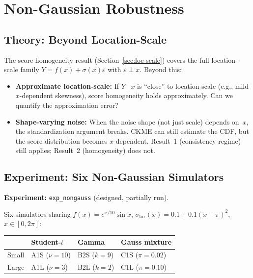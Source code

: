 \documentclass[11pt]{article}
\begin{document}
\section{Non-Gaussian Robustness}
\label{sec:exp-nongauss}

\subsection{Theory: Beyond Location-Scale}

The score homogeneity result (Section~\ref{sec:loc-scale}) covers the
full location-scale family $Y = f(x) + \sigma(x)\varepsilon$ with
$\varepsilon \perp x$. Beyond this:

\begin{itemize}
  \item \textbf{Approximate location-scale:} If $Y \mid x$ is
    ``close'' to location-scale (e.g., mild $x$-dependent skewness),
    score homogeneity holds approximately. Can we quantify the
    approximation error?
  \item \textbf{Shape-varying noise:} When the noise shape (not just
    scale) depends on~$x$, the standardization argument breaks. CKME
    can still estimate the CDF, but the score distribution becomes
    $x$-dependent. Result~1 (consistency regime) still applies;
    Result~2 (homogeneity) does not.
\end{itemize}

\subsection{Experiment: Six Non-Gaussian Simulators}

\textbf{Experiment:} \texttt{exp\_nongauss} (designed, partially run).

Six simulators sharing $f(x) = e^{x/10}\sin x$,
$\sigma_{\mathrm{tar}}(x) = 0.1 + 0.1(x-\pi)^2$, $x \in [0, 2\pi]$:

\begin{center}
\begin{tabular}{@{}llll@{}}
\toprule
& \textbf{Student-$t$} & \textbf{Gamma} & \textbf{Gauss mixture} \\
\midrule
Small & A1S ($\nu = 10$) & B2S ($k = 9$) & C1S ($\pi = 0.02$) \\
Large & A1L ($\nu = 3$)  & B2L ($k = 2$) & C1L ($\pi = 0.10$) \\
\bottomrule
\end{tabular}
\end{center}
\end{document}
